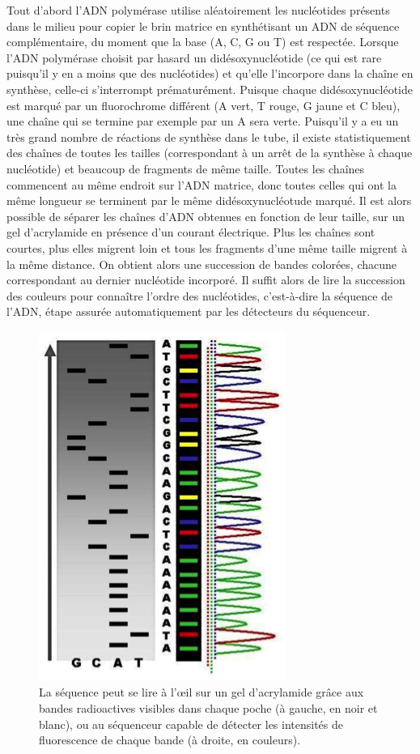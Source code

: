 \documentclass[12pt, openany]{report}
\begin{document}
Tout d'abord l’ADN polymérase utilise aléatoirement les nucléotides présents dans le milieu pour copier le brin matrice en synthétisant un ADN de séquence complémentaire, du moment que la base (A, C, G ou T) est respectée. Lorsque l’ADN polymérase choisit par hasard un didésoxynucléotide (ce qui est rare puisqu'il y en a moins que des nucléotides) et qu’elle l’incorpore dans la chaîne en synthèse, celle-ci s’interrompt prématurément. Puisque chaque didésoxynucléotide est marqué par un fluorochrome différent (A vert, T rouge, G jaune et C bleu), une chaîne qui se termine par exemple par un A sera verte. Puisqu'il y a eu un très grand nombre de réactions de synthèse dans le tube, il existe statistiquement des chaînes de toutes les tailles (correspondant à un arrêt de la synthèse à chaque nucléotide) et beaucoup de fragments de même taille. Toutes les chaînes commencent au même endroit sur l'ADN matrice, donc toutes celles qui ont la même longueur se terminent par le même didésoxynucléotude marqué. Il est alors possible de séparer les chaînes d’ADN obtenues en fonction de leur taille, sur un gel d’acrylamide en présence d'un courant électrique. Plus les chaînes sont courtes, plus elles migrent loin et tous les fragments d'une même taille migrent à la même distance. On obtient alors une succession de bandes colorées, chacune correspondant au dernier nucléotide incorporé. Il suffit alors de lire la succession des couleurs pour connaître l’ordre des nucléotides, c'est-à-dire la séquence de l’ADN, étape assurée automatiquement par les détecteurs du séquenceur.

\begin{figure}[H]
\begin{center}
    \includegraphics[scale=0.9]{Images/im3.png}
\caption{La séquence peut se lire à l'œil sur un gel d'acrylamide grâce aux bandes radioactives visibles dans chaque poche (à gauche, en noir et blanc), ou au séquenceur capable de détecter les intensités de fluorescence de chaque bande (à droite, en couleurs).}
\end{center}
\end{figure}
\end{document}
